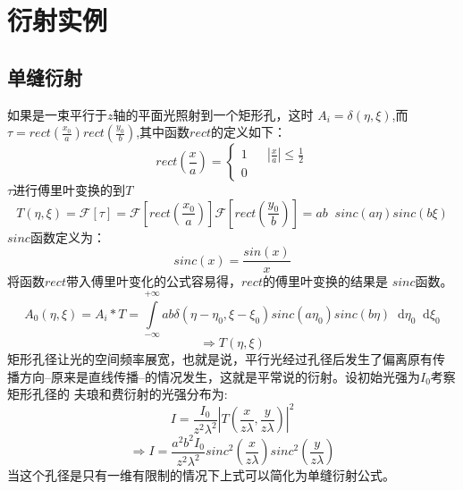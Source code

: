 \documentclass{article}
\newcommand*{\dif}{\mathop{}\!\mathrm{d}}
\begin{document}
\section{衍射实例}
\subsection{单缝衍射}
如果是一束平行于$z$轴的平面光照射到一个矩形孔，这时
$A_i=\delta(\eta,\xi)$,而
$\tau=rect(\frac{x_0}{a})rect(\frac{y_0}{b})$,其中函数$rect$的定义如下：
\[
  rect(\frac{x}{a})=\left \{
    \begin{array}{rcl}
      1 && |\frac{x}{a}|\leq \frac{1}{2}\\
      0 && {}
    \end{array}
  \right
  .
\]
$\tau$进行傅里叶变换的到$T$
\[T(\eta,\xi)=\mathscr{F}[\tau]=\mathscr{F}[rect(\frac{x_0}{a})]\mathscr{F}[rect(\frac{y_0}{b})]=ab\mathop{}\!sinc(a\eta)sinc(b\xi)\]
$sinc$函数定义为：
\[sinc(x)=\frac{sin(x)}{x}\]
将函数$rect$带入傅里叶变化的公式容易得，$rect$的傅里叶变换的结果是
$sinc$函数。
\[A_0(\eta,\xi)=A_i*T=\int\limits_{-\infty}^{+\infty}ab\delta(\eta-\eta_0,\xi-\xi_0)sinc(a\eta_0)sinc(b\eta)\dif\eta_0\dif\xi_0\]
\[\Rightarrow T(\eta,\xi)\]
矩形孔径让光的空间频率展宽，也就是说，平行光经过孔径后发生了偏离原有传
播方向--原来是直线传播--的情况发生，这就是平常说的衍射。设初始光强为$I_0$考察矩形孔径的
夫琅和费衍射的光强分布为:
\[I=\frac{I_0}{z^2\lambda^2}|T(\frac{x}{z\lambda},\frac{y}{z\lambda})|^2\]
\[\Rightarrow I=\frac{a^2b^2I_0}{z^2\lambda^2}sinc^2(\frac{x}{z\lambda})sinc^2(\frac{y}{z\lambda})\]
当这个孔径是只有一维有限制的情况下上式可以简化为单缝衍射公式。
\end{document}
